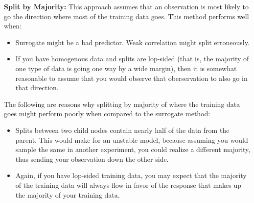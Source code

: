 \documentclass[11pt]{article}
\begin{document}
\vspace{2 mm}
\noindent
{\bf Split by Majority:} This approach assumes that an observation is most 
likely to go the direction where most of the training data goes. This method 
performs well when:

\begin{itemize}
\item Surrogate might be a bad predictor. Weak correlation might split 
erroneously.
\item If you have homogenous data and splits are lop-sided (that is, the 
majority of one type of data is going one way by a wide margin), then it is 
somewhat reasonable to assume that you would observe that oberservation to also 
go in that direction.
\end{itemize}

\vspace{2 mm}
\noindent
The following are reasons why splitting by majority of where the training data 
goes might perform poorly when compared to the surrogate method:

\begin{itemize}
\item Splits between two child nodes contain nearly half of the data from the 
parent. This would make for an unstable model, because assuming you would 
sample the same in another experiment, you could realize a different majority, 
thus sending your observation down the other side.
\item Again, if you have lop-sided training data, you may expect that the 
majority of the training data will always flow in favor of the response that 
makes up the majority of your training data.
\end{itemize}
\end{document}
